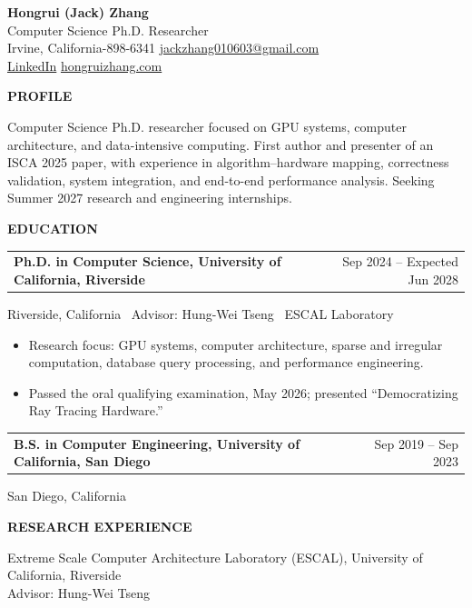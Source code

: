 \documentclass[11pt]{article}
\makeatletter
\newcommand{\resheading}[1]{%
  \par\addvspace{10pt}%
  \noindent\colorbox{sectiongray}{%
    \parbox{\dimexpr\linewidth-2\fboxsep\relax}{\strut\small\textbf{#1}}%
  }\par\nobreak\vspace{4pt}\nopagebreak[4]%
}
\newcommand{\resumeentry}[3]{%
  \par\addvspace{6pt}%
  \begin{tabularx}{\linewidth}{@{}>{\raggedright\arraybackslash}X@{\hspace{1em}}r@{}}%
    \textbf{#1} & {\small #2}\\%
  \end{tabularx}\par\nobreak%
  {\small #3\par}\nobreak\nopagebreak[4]%
}
\makeatother
\begin{document}
\begin{center}
  {\fontsize{24}{27}\selectfont\textbf{Hongrui (Jack) Zhang}}\\[3pt]
  {\large Computer Science Ph.D. Researcher}\\[5pt]
  Irvine, California\enspace\textbar{}-898-6341\enspace\textbar\enspace
  \href{mailto:jackzhang010603@gmail.com}{jackzhang010603@gmail.com}\\[2pt]
  \href{https://www.linkedin.com/in/hongruizhang63}{LinkedIn}\enspace\textbar\enspace
  \href{https://hongruizhang.com}{hongruizhang.com}
\end{center}
\vspace{-4pt}

\resheading{PROFILE}
Computer Science Ph.D. researcher focused on GPU systems, computer architecture, and data-intensive computing.
First author and presenter of an ISCA 2025 paper, with experience in algorithm--hardware mapping,
correctness validation, system integration, and end-to-end performance analysis.
Seeking Summer 2027 research and engineering internships.

\resheading{EDUCATION}
\resumeentry{Ph.D. in Computer Science, University of California, Riverside}
  {Sep 2024 -- Expected Jun 2028}
  {Riverside, California \textbar\ Advisor: Hung-Wei Tseng \textbar\ ESCAL Laboratory}
\begin{itemize}
  \item Research focus: GPU systems, computer architecture, sparse and irregular computation, database query processing, and performance engineering.
  \item Passed the oral qualifying examination, May 2026; presented ``Democratizing Ray Tracing Hardware.''
\end{itemize}
\resumeentry{B.S. in Computer Engineering, University of California, San Diego}
  {Sep 2019 -- Sep 2023}
  {San Diego, California}

\resheading{RESEARCH EXPERIENCE}
{\small Extreme Scale Computer Architecture Laboratory (ESCAL), University of California, Riverside\\
Advisor: Hung-Wei Tseng\par}
\end{document}
